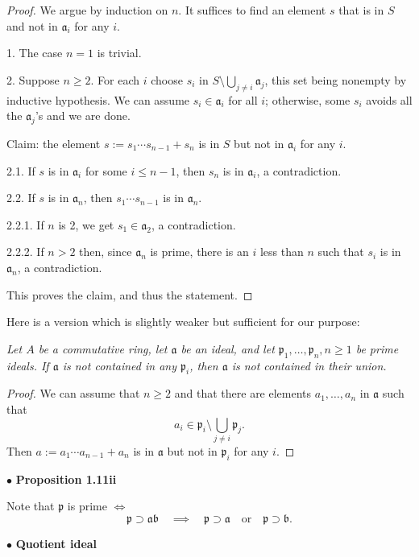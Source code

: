 \documentclass[parskip=half,fontsize=12pt]{scrartcl}%
\newcommand{\mf}{\mathfrak}
\newcommand{\ppp}{\mf p}
\newcommand{\bu}{\bullet}
\begin{document}
\begin{proof} 
We argue by induction on $n$. It suffices to find an element $s$ that is in $S$ and not in $\mf a_i$ for any $i$. 

1. The case $n=1$ is trivial. 

2. Suppose $n\ge2$. For each $i$ choose $s_i$ in $S\setminus\bigcup_{j \ne i}\mf a_j$, this set being nonempty by inductive hypothesis. We can assume $s_i \in \mf a_i$ for all $i$; otherwise, some $s_i$ avoids all the $\mf a_j$'s and we are done. 

Claim: the element $s:=s_1\cdots s_{n-1}+s_n$ is in $S$ but not in $\mf a_i$ for any $i$. 

2.1. If $s$ is in $\mf a_i$ for some $i\le n-1$, then $s_n$ is in $\mf a_i$, a contradiction. 

2.2. If $s$ is in $\mf a_n$, then $s_1\cdots s_{n-1}$ is in $\mf a_n$. 

2.2.1. If $n$ is 2, we get $s_1\in \mf a_2$, a contradiction.

2.2.2. If $n>2$ then, since $\mf a_n$ is prime, there is an $i$ less than $n$ such that $s_i$ is in $\mf a_n$, a contradiction.

This proves the claim, and thus the statement. 
\end{proof}

Here is a version which is slightly weaker but sufficient for our purpose:

\emph{Let $A$ be a commutative ring, let $\mf a$ be an ideal, and let $\ppp_1,\dots,\ppp_n,n\ge1$ be prime ideals. If $\mf a$ is not contained in any $\ppp_i$, then $\mf a$ is not contained in their union.}

\begin{proof} 
We can assume that $n\ge2$ and that there are elements $a_1,\dots,a_n$ in $\mf a$ such that 
$$
a_i\in\ppp_i\setminus\bigcup_{j \ne i}\ppp_j.
$$ 
Then $a:=a_1\cdots a_{n-1}+a_n$ is in $\mf a$ but not in $\ppp_i$ for any $i$.
\end{proof}


$\bu$ \textbf{Proposition 1.11ii}%

Note that $\ppp$ is prime $\iff$
$$
\ppp\supset\mf a\mf b\quad\implies\quad\ppp\supset\mf a\quad\text{or}\quad\ppp\supset\mf b.
$$

$\bu$ \textbf{Quotient ideal}%
\end{document}
